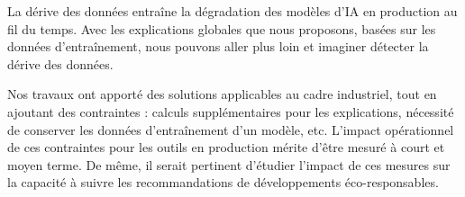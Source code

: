 La dérive des données entraîne la dégradation des modèles d'IA en production au fil du temps. Avec les explications globales que nous proposons, basées sur les données d'entraînement, nous pouvons aller plus loin et imaginer détecter la dérive des données.

Nos travaux ont apporté des solutions applicables au cadre industriel, tout en ajoutant des contraintes : calculs supplémentaires pour les explications, nécessité de conserver les données d'entraînement d'un modèle, etc. L'impact opérationnel de ces contraintes pour les outils en production mérite d'être mesuré à court et moyen terme. De même, il serait pertinent d'étudier l'impact de ces mesures sur la capacité à suivre les recommandations de développements éco-responsables.
